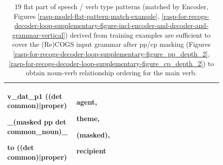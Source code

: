 \documentclass[11pt]{article}
\begin{document}
\begin{table}
\begin{tabular}{p{0.225\linewidth} p{0.50\linewidth} p{0.15\linewidth}}
\begin{tiny}
v\_dat\_p1 ((det common)|proper) 

\_(masked pp det common\_noun)\_ 

to ((det common)|proper)\end{tiny} & \begin{tiny}agent, 

theme,

(masked),

recipient\end{tiny} \\
\hline
\end{tabular}
\caption{19 flat part of speech / verb type patterns (matched by Encoder, Figures \ref{rasp-model-flat-pattern-match-example}, \ref{rasp-for-recogs-decoder-loop-supplementary-figure-incl-encoder-and-decoder-and-grammar-vertical}) derived from training examples are sufficient to cover the (Re)COGS input grammar after pp/cp masking (Figures \ref{rasp-for-recogs-decoder-loop-supplementary-figure_pp_depth_2}, \ref{rasp-for-recogs-decoder-loop-supplementary-figure_cp_depth_2}) to obtain noun-verb relationship ordering for the main verb.
}
\label{RASP-model-flat-patterns-after-masking-to-nv-relationships-table}
\end{table}
\end{document}
